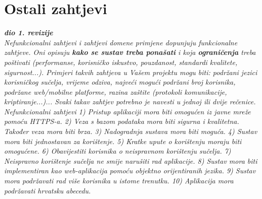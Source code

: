 		\section{Ostali zahtjevi}
		
			\textbf{\textit{dio 1. revizije}}\\
		 
			 \textit{Nefunkcionalni zahtjevi i zahtjevi domene primjene dopunjuju funkcionalne zahtjeve. Oni opisuju \textbf{kako se sustav treba ponašati} i koja \textbf{ograničenja} treba poštivati (performanse, korisničko iskustvo, pouzdanost, standardi kvalitete, sigurnost...). Primjeri takvih zahtjeva u Vašem projektu mogu biti: podržani jezici korisničkog sučelja, vrijeme odziva, najveći mogući podržani broj korisnika, podržane web/mobilne platforme, razina zaštite (protokoli komunikacije, kriptiranje...)... Svaki takav zahtjev potrebno je navesti u jednoj ili dvije rečenice.
			 Nefunkcionalni zahtjevi
			 1) Pristup aplikaciji mora biti omogućen iz javne mreže pomoću HTTPS-a.
			 2) Veza s bazom podataka mora biti sigurna i kvalitetna. Također veza mora biti brza.
			 3) Nadogradnja sustava mora biti moguća.
			 4) Sustav mora biti jednostavan za korištenje.
			 5) Kratke upute o korištenju moraju biti omogućene.
			 6) Obavijestiti korisnika o neispravnom korištenju sučelja.
			 7) Neispravno korištenje sučelja ne smije narušiti rad aplikacije.
			 8) Sustav mora biti implementiran kao web-aplikacija pomoću objektno orijentiranih jezika.
			 9) Sustav mora podržavati rad više korisnika u istome trenutku.
			 10) Aplikacija mora podržavati hrvatsku abecedu.}\\
			 
			 
			 
	